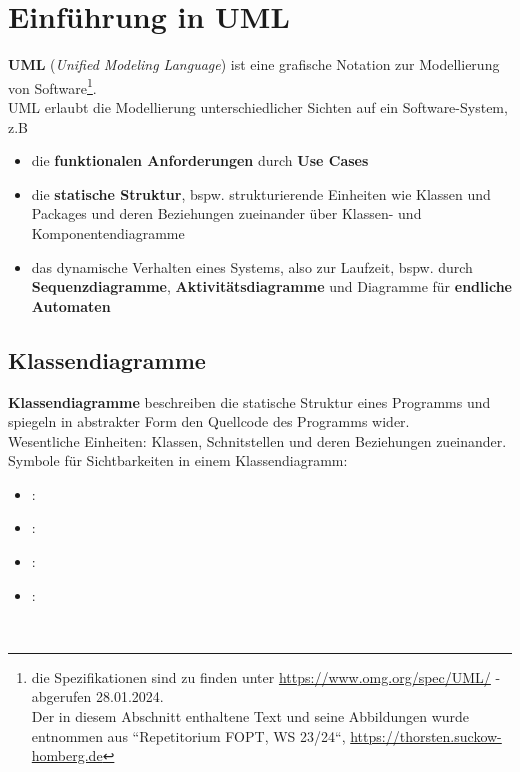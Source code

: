 \chapter{Einführung in UML}

\textbf{UML} (\textit{Unified Modeling Language}) ist eine grafische Notation zur Modellierung von Software\footnote{
die Spezifikationen sind zu finden unter \url{https://www.omg.org/spec/UML/} - abgerufen 28.01.2024.\\
Der in diesem Abschnitt enthaltene Text und seine Abbildungen wurde entnommen aus ``Repetitorium FOPT, WS 23/24``, \url{https://thorsten.suckow-homberg.de}
}.\\

\noindent
UML erlaubt die Modellierung unterschiedlicher Sichten auf ein Software-System, z.B

\begin{itemize}
    \item die \textbf{funktionalen Anforderungen} durch \textbf{Use Cases}
    \item die \textbf{statische Struktur}, {bspw.} strukturierende Einheiten wie Klassen und Packages und deren Beziehungen zueinander über Klassen- und Komponentendiagramme
    \item das dynamische Verhalten eines Systems, also zur Laufzeit, {bspw.} durch \textbf{Sequenzdiagramme}, \textbf{Aktivitätsdiagramme} und Diagramme für \textbf{endliche Automaten}
\end{itemize}
\noindent

\section{Klassendiagramme}

\textbf{Klassendiagramme} beschreiben die statische Struktur eines Programms und spiegeln in abstrakter Form den Quellcode des Programms wider.\\

\noindent
Wesentliche Einheiten: Klassen, Schnitstellen und deren Beziehungen zueinander.\\

\noindent
Symbole für Sichtbarkeiten in einem Klassendiagramm:

\begin{itemize}
    \item {}: \code{+}
    \item {}: \code{-}
    \item {}: \code{#}
    \item {}: \code{~}
\end{itemize}\\

